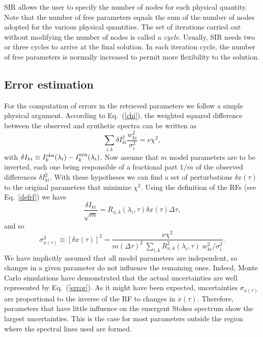 SIR allows the user to specify the number of nodes for each physical
quantity. Note that the number of free parameters equals the sum of the
number of nodes adopted for the various physical quantities. The set of
iterations carried out without modifying the number of nodes is called a
{\em cycle}. Usually, SIR needs two or three cycles to arrive at the final
solution. In each iteration cycle, the number of free parameters is normally 
increased to permit more flexibility to the solution.

\subsection{Error estimation}
For the computation of errors in the retrieved parameters we 
follow a simple physical argument. According to Eq.\ (\ref{chi}), the weighted 
squared difference between the observed and synthetic spectra 
can be written as 
\begin{equation}
\sum_{i,k} \delta I^2_{ki} \frac{w^2_{ki}}{\sigma_i^2} = \nu \chi^2,
\end{equation}
with $\delta I_{ki} \equiv I^{\rm obs}_k(\lambda_i) - 
I^{\rm syn}_k(\lambda_i)$. Now assume that $m$ model parameters 
are to be inverted, each one being responsible of a fractional part 
$1/m$ of the observed differences $\delta I^2_{ki}$. With these hypotheses 
we can find a set of perturbations $\delta x(\tau)$ to the original parameters 
that minimize $\chi^2$. Using the definition of the RFs (see Eq.\ \ref{defrf}) 
we have 
\begin{equation}
\frac{\delta I_{ki}}{\sqrt{m}}  = R_{x,k}(\lambda_i,\tau) \delta x(\tau) 
\Delta \tau,
\end{equation}
and so
\begin{equation}
\label{error}
\sigma^2_{x(\tau)} \equiv [\delta x(\tau)]^2 = \frac{\nu \chi^2}{m (\Delta \tau)^2 \;
\sum_{i,k} R^2_{x,k}(\lambda_i,\tau) \; w^2_{ki}/\sigma^2_i}.
\end{equation}
We have implicitly assumed that all model parameters are independent, so
changes in a given parameter do not influence the remaining ones. Indeed, 
Monte Carlo simulations have demonstrated that the actual uncertainties 
are well represented by Eq.\ (\ref{error}).  As it might have been 
expected, uncertainties $\sigma_{x(\tau)}$ are proportional to the inverse 
of the RF to changes in $x(\tau)$. Therefore, parameters that have little 
influence on the emergent Stokes spectrum show the largest uncertainties. 
This is the case for most parameters outside the region where the 
spectral lines used are formed.


